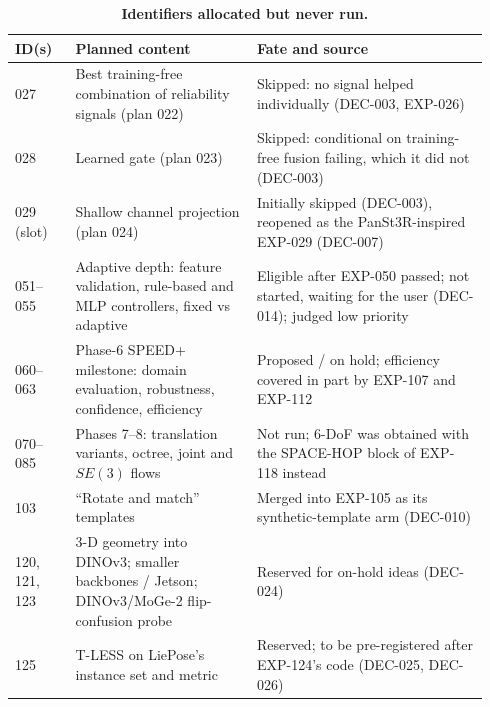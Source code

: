 \begin{table}[p]
  \centering\footnotesize
  \setlength{\tabcolsep}{3pt}
  \begin{tabular}{@{}p{0.12\linewidth}p{0.36\linewidth}p{0.46\linewidth}@{}}
    \toprule
    ID(s) & Planned content & Fate and source \\
    \midrule
    027 & Best training-free combination of reliability signals (plan 022) & Skipped: no signal helped individually (DEC-003, EXP-026) \\
    028 & Learned gate (plan 023) & Skipped: conditional on training-free fusion failing, which it did not (DEC-003) \\
    029 (slot) & Shallow channel projection (plan 024) & Initially skipped (DEC-003), reopened as the PanSt3R-inspired EXP-029 (DEC-007) \\
    051--055 & Adaptive depth: feature validation, rule-based and MLP controllers, fixed vs adaptive & Eligible after EXP-050 passed; not started, waiting for the user (DEC-014); judged low priority \\
    060--063 & Phase-6 SPEED+ milestone: domain evaluation, robustness, confidence, efficiency & Proposed / on hold; efficiency covered in part by EXP-107 and EXP-112 \\
    070--085 & Phases 7--8: translation variants, octree, joint and $SE(3)$ flows & Not run; 6-DoF was obtained with the SPACE-HOP block of EXP-118 instead \\
    103 & ``Rotate and match'' templates & Merged into EXP-105 as its synthetic-template arm (DEC-010) \\
    120, 121, 123 & 3-D geometry into DINOv3; smaller backbones / Jetson; DINOv3/MoGe-2 flip-confusion probe & Reserved for on-hold ideas (DEC-024) \\
    125 & T-LESS on LiePose's instance set and metric & Reserved; to be pre-registered after EXP-124's code (DEC-025, DEC-026) \\
    \bottomrule
  \end{tabular}
  \caption{\textbf{Identifiers allocated but never run.}}
  \label{app:log_tab5}
\end{table}

\clearpage

